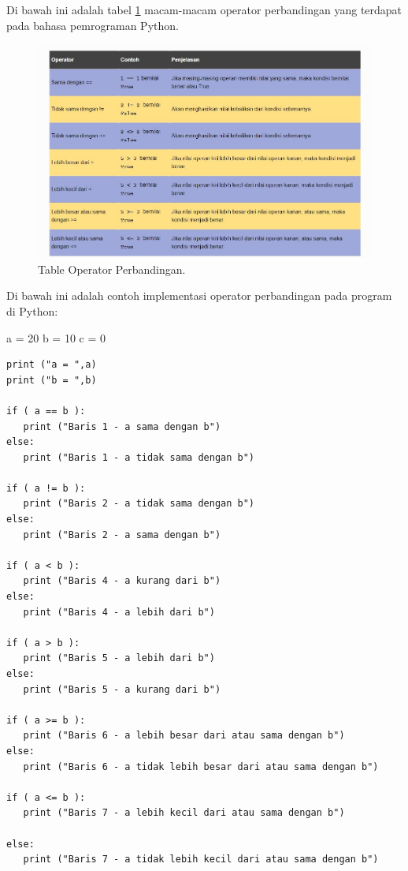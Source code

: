 \begin{eqation}
Di bawah ini adalah tabel \ref{tableperbandingan} macam-macam operator perbandingan yang terdapat pada bahasa pemrograman Python.
\begin{figure}[ht]
	\centerline{\includegraphics[width=1\textwidth]{Plagiarisme/tableperbandingan.JPG}}
	\caption{Table Operator Perbandingan.}
	\label{tableperbandingan}
\end{figure}

Di bawah ini adalah contoh implementasi operator perbandingan pada program di Python:

a = 20
b = 10
c = 0

\begin{verbatim}
print ("a = ",a)
print ("b = ",b)

if ( a == b ):
   print ("Baris 1 - a sama dengan b")
else:
   print ("Baris 1 - a tidak sama dengan b")

if ( a != b ):
   print ("Baris 2 - a tidak sama dengan b")
else:
   print ("Baris 2 - a sama dengan b")

if ( a < b ):
   print ("Baris 4 - a kurang dari b") 
else:
   print ("Baris 4 - a lebih dari b")

if ( a > b ):
   print ("Baris 5 - a lebih dari b") 
else:
   print ("Baris 5 - a kurang dari b")

if ( a >= b ):
   print ("Baris 6 - a lebih besar dari atau sama dengan b") 
else:
   print ("Baris 6 - a tidak lebih besar dari atau sama dengan b") 

if ( a <= b ):
   print ("Baris 7 - a lebih kecil dari atau sama dengan b") 

else:
   print ("Baris 7 - a tidak lebih kecil dari atau sama dengan b")    
   
\end{verbatim}


\end{eqation}
